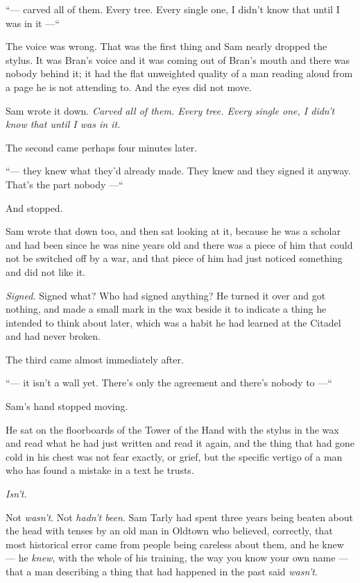 “— carved all of them. Every tree. Every single one, I didn’t know that until I was in it —“

The voice was wrong. That was the first thing and Sam nearly dropped the stylus. It was Bran’s voice and it was coming out of Bran’s mouth and there was nobody behind it; it had the flat unweighted quality of a man reading aloud from a page he is not attending to. And the eyes did not move.

Sam wrote it down. \textit{Carved all of them. Every tree. Every single one, I didn’t know that until I was in it.}

The second came perhaps four minutes later.

“— they knew what they’d already made. They knew and they signed it anyway. That’s the part nobody —“

And stopped.

Sam wrote that down too, and then sat looking at it, because he was a scholar and had been since he was nine years old and there was a piece of him that could not be switched off by a war, and that piece of him had just noticed something and did not like it.

\textit{Signed.} Signed what? Who had signed anything? He turned it over and got nothing, and made a small mark in the wax beside it to indicate a thing he intended to think about later, which was a habit he had learned at the Citadel and had never broken.

The third came almost immediately after.

“— it isn’t a wall yet. There’s only the agreement and there’s nobody to —“

Sam’s hand stopped moving.

He sat on the floorboards of the Tower of the Hand with the stylus in the wax and read what he had just written and read it again, and the thing that had gone cold in his chest was not fear exactly, or grief, but the specific vertigo of a man who has found a mistake in a text he trusts.

\textit{Isn’t.}

Not \textit{wasn’t}. Not \textit{hadn’t been}. Sam Tarly had spent three years being beaten about the head with tenses by an old man in Oldtown who believed, correctly, that most historical error came from people being careless about them, and he knew — he \textit{knew}, with the whole of his training, the way you know your own name — that a man describing a thing that had happened in the past said \textit{wasn’t}.

